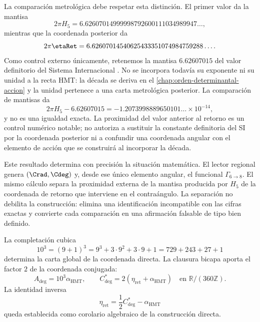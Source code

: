 La comparación metrológica debe respetar esta distinción. El primer valor da
la mantisa
\[
2\pi H_5
=6.62607014999998792600111034989947\ldots,
\]
mientras que la coordenada posterior da
\[
2\pi\etaRet
=6.62607014540625433351074984759288\ldots.
\]
Como control externo únicamente, retenemos la mantisa \(6.62607015\) del
valor definitorio del Sistema Internacional \cite{BIPMSI}. No se incorpora
todavía su exponente ni su unidad a la recta HMT: la década se deriva en el
\cref{chap:orden-determinantal-accion} y la unidad pertenece a una carta
metrológica posterior. La comparación de mantisas da
\[
2\pi H_5-6.62607015
=-1.2073998889650101\ldots\times10^{-14},
\]
y no es una igualdad exacta. La proximidad del valor anterior al retorno es
un control numérico notable; no autoriza a sustituir la constante definitoria
del SI por la coordenada posterior ni a confundir una coordenada angular con
el elemento de acción que se construirá al incorporar la década.

Este resultado determina con precisión la situación matemática. El lector
regional genera \((\Crad,\Cdeg)\) y, desde ese único elemento angular, el funcional
\(\Gamma_{6\to8}\). El mismo cálculo separa la proximidad externa de la
mantisa producida por \(H_5\) de la coordenada de retorno que interviene en el
contraángulo. La separación no debilita la construcción: elimina una
identificación incompatible con las cifras exactas y convierte cada
comparación en una afirmación falsable de tipo bien definido.

\label{sec:l9s102:par-angular}

La completación cubica
\begin{equation}
 10^3=(9+1)^3=9^3+3\cdot9^2+3\cdot9+1
 =729+243+27+1
 \label{eq:l9s102:base-1000}
\end{equation}
determina la carta global de la coordenada directa. La clausura bicapa aporta
el factor \(2\) de la coordenada conjugada:
\begin{equation}
 \boxed{
 A_{\deg}=10^3\alpha_{\mathrm{HMT}},
 \qquad
 C^*_{\deg}=2(\eta_{\mathrm{ret}}+\alpha_{\mathrm{HMT}})
 \quad\text{en }\mathbb R/(360\mathbb Z).}
 \label{eq:l9s102:a-cstar-deg}
\end{equation}
La identidad inversa
\begin{equation}
 \eta_{\mathrm{ret}}=\frac12C^*_{\deg}-\alpha_{\mathrm{HMT}}
 \label{eq:l9s102:eta-corolario-inverso}
\end{equation}
queda establecida como corolario algebraico de la construcción directa.


